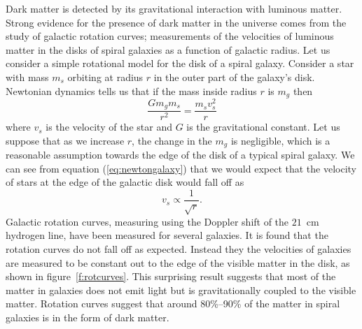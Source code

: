 Dark matter is detected by its gravitational interaction with luminous matter.
Strong evidence for the presence of dark matter in the universe comes from the
study of galactic rotation curves; measurements of the velocities of luminous
matter in the disks of spiral galaxies as a function of galactic radius.  Let
us consider a simple rotational model for the disk of a spiral galaxy.
Consider a star with mass $m_s$ orbiting at radius $r$ in the outer part of
the galaxy's disk. Newtonian dynamics tells us that if the mass inside radius
$r$ is $m_g$ then
\begin{equation}
\frac{Gm_g m_s}{r^2} = \frac{m_s v_s^2}{r}
\label{eq:newtongalaxy}
\end{equation}
where $v_s$ is the velocity of the star and $G$ is the gravitational constant. 
Let us suppose that as we increase $r$, the change in the $m_g$ is negligible,
which is a reasonable assumption towards the edge of the disk of a typical
spiral galaxy.  We can see from equation (\ref{eq:newtongalaxy}) that we would
expect that the velocity of stars at the edge of the galactic disk would fall
off as 
\begin{equation}
v_s \propto \frac{1}{\sqrt{r}}.
\end{equation}
Galactic rotation curves, measuring using the Doppler shift of the
$21$~cm hydrogen line, have been measured for several galaxies. It is found
that the rotation curves do not fall off as expected. Instead they the
velocities of galaxies are measured to be constant out to the edge of the
visible matter in the disk, as shown in figure~\ref{f:rotcurves}.  This
surprising result suggests that most of the matter in galaxies does not emit
light but is gravitationally coupled to the visible matter. Rotation curves
suggest that around 80\%--90\% of the matter in spiral galaxies is in the form
of dark matter\cite{Sancisi:1987}.

